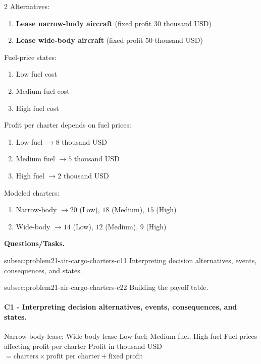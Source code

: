 	\begin{multicols}{2}
		Alternatives:
		\begin{enumerate}[label=\arabic*.]
			\item \textbf{Lease narrow-body aircraft} (fixed profit $30$ thousand USD)
			\item \textbf{Lease wide-body aircraft} (fixed profit $50$ thousand USD)
		\end{enumerate}

		Fuel-price states:
		\begin{enumerate}[label=\arabic*.]
			\item Low fuel cost
			\item Medium fuel cost
			\item High fuel cost
		\end{enumerate}

			\columnbreak

		Profit per charter depends on fuel prices:
		\begin{enumerate}[label=\arabic*.]
			\item Low fuel $\to 8$ thousand USD
			\item Medium fuel $\to 5$ thousand USD
			\item High fuel $\to 2$ thousand USD
		\end{enumerate}

		Modeled charters:
		\begin{enumerate}[label=\arabic*.]
			\item Narrow-body $\to 20$ (Low), $18$ (Medium), $15$ (High)
			\item Wide-body $\to 14$ (Low), $12$ (Medium), $9$ (High)
		\end{enumerate}
	\end{multicols}

	\textbf{Questions/Tasks.}
	\begin{enumerate}
		\CriterionTask
		{subsec:problem21-air-cargo-charters-c1}{1}
		{Interpreting decision alternatives, events, consequences, and states.}

		\CriterionTask
		{subsec:problem21-air-cargo-charters-c2}{2}
		{Building the payoff table.}
	\end{enumerate}

	\paragraph*{C1 - Interpreting decision alternatives, events, consequences, and states.}
	\label{subsec:problem21-air-cargo-charters-c1}
	\DecisionElementsTable
	{Narrow-body lease; Wide-body lease}
	{Low fuel; Medium fuel; High fuel}
	{Fuel prices affecting profit per charter}
	{Profit in thousand USD $= \text{charters} \times \text{profit per charter} + \text{fixed profit}$}

